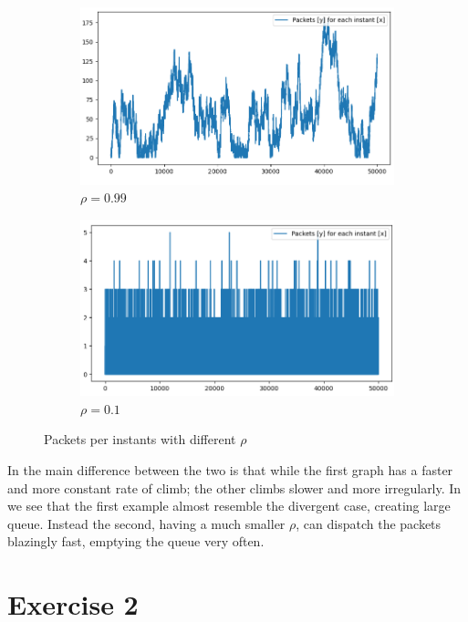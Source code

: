 \documentclass[10pt,a4paper]{article}
\begin{document}
\begin{figure}[h]
  \medskip
  \begin{subfigure}[t]{.45\textwidth}
    \centering
	\includegraphics[width=\linewidth]{img/rho0.99}
    \caption{\(\rho = 0.99\)}
	\label{fig:rho099}
  \end{subfigure}
  \hfill
  \begin{subfigure}[t]{.45\textwidth}
    \centering
	\includegraphics[width=\linewidth]{img/rho0.1}
    \caption{\(\rho = 0.1\)}
	\label{fig:rho010}
  \end{subfigure}
  \caption{Packets per instants with different \(\rho\)}
\end{figure}
  

In  the main difference between the two is that while the first graph has a faster and more constant rate of climb; the other climbs slower and more irregularly. In   we see that the first example almost resemble the divergent case, creating large queue. Instead the second, having a much smaller \(\rho\), can dispatch the packets blazingly fast, emptying the queue very often.

\section*{Exercise 2}
\end{document}
